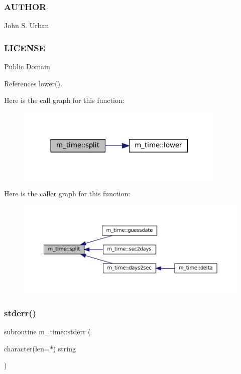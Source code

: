  \subsubsection*{A\+U\+T\+H\+OR}

John S. Urban \subsubsection*{L\+I\+C\+E\+N\+SE}

Public Domain 

References lower().

Here is the call graph for this function\+:\nopagebreak
\begin{figure}[H]
\begin{center}
\leavevmode
\includegraphics[width=284pt]{namespacem__time_a16627f5dab7e40434531eed45cb3ea26_cgraph}
\end{center}
\end{figure}
Here is the caller graph for this function\+:\nopagebreak
\begin{figure}[H]
\begin{center}
\leavevmode
\includegraphics[width=350pt]{namespacem__time_a16627f5dab7e40434531eed45cb3ea26_icgraph}
\end{center}
\end{figure}
\mbox{\label{namespacem__time_ac729ead2b5aa4c756d52284cd7d22bf2}} 
\subsubsection{\texorpdfstring{stderr()}{stderr()}}
{\footnotesize\ttfamily subroutine m\+\_\+time\+::stderr (\begin{DoxyParamCaption}\item[{character(len=$\ast$)}]{string }\end{DoxyParamCaption})\hspace{0.3cm}{\ttfamily [private]}}

